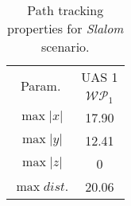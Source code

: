     
    \begin{table}[H]
        \centering
        \begin{tabular}{c||c}
            \multirow{2}{*}{Param.} & UAS 1\\\cline{2-2}
                            & $\mathscr{WP}_1$  \\\hline\hline
              $\max |x|$    & 17.90      \\\hline
              $\max |y|$    & 12.41    \\\hline
              $\max |z|$    & 0        \\\hline
              $\max dist.$  & 20.06   \\
        \end{tabular}
        \caption{Path tracking properties for \emph{Slalom} scenario.}
        \label{tab:pathTrackingParametersForSlalomAvoidance}
    \end{table}
    
    
